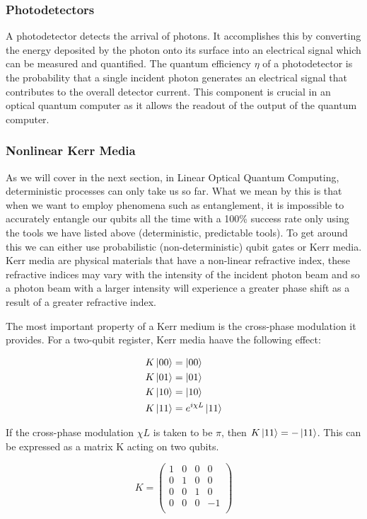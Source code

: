 \subsubsection{Photodetectors}
A photodetector detects the arrival of photons. It accomplishes this by converting the energy deposited by the photon onto its surface into an electrical signal which can be measured and quantified. The quantum efficiency $\eta$ of a photodetector is the probability that a single incident photon generates an electrical signal that contributes to the overall detector current. This component is crucial in an optical quantum computer as it allows the readout of the output of the quantum computer. 


\subsubsection{Nonlinear Kerr Media}
As we will cover in the next section, in Linear Optical Quantum Computing, deterministic processes can only take us so far. What we mean by this is that when we want to employ phenomena such as entanglement, it is impossible to accurately entangle our qubits all the time with a 100\% success rate only using the tools we have listed above (deterministic, predictable tools). To get around this we can either use probabilistic (non-deterministic) qubit gates or Kerr media. Kerr media are physical materials that have a non-linear refractive index, these refractive indices may vary with the intensity of the incident photon beam and so a photon beam with a larger intensity will experience a greater phase shift as a result of a greater refractive index.
\par 
The most important property of a Kerr medium is the cross-phase modulation it provides. For a two-qubit register, Kerr media haave the following effect:

\begin{align*} 
    K \ket{00} &=  \ket{00}\\
    K \ket{01} &=  \ket{01}\\
    K \ket{10} &=  \ket{10}\\
    K \ket{11} &=  e^{i\chi L}\ket{11}
    \end{align*}
    
If the cross-phase modulation $\chi L$ is taken to be $\pi$, then $K \ket{11} =  -\ket{11}$. This can be expressed as a matrix K acting on two qubits.

$$K = \begin{pmatrix}
    1 & 0 & 0 & 0\\
    0 & 1 & 0 & 0\\
    0 & 0 & 1 & 0\\
    0 & 0 & 0 & -1\\
    \end{pmatrix}$$

